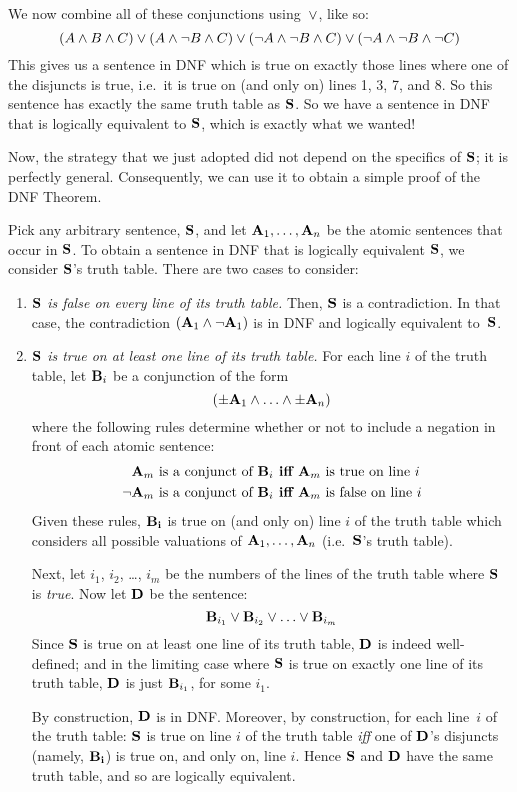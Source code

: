 We now combine all of these conjunctions using~$\vee$, like so:
$$(A \wedge B \wedge C) \vee (A \wedge \neg B \wedge C) \vee (\neg A \wedge \neg B \wedge C) \vee (\neg A \wedge \neg B \wedge \neg C)$$
This gives us a sentence in DNF which is true on exactly those lines where one of the disjuncts is true, i.e.\ it is true on (and only on) lines 1, 3, 7, and 8. So this sentence has exactly the same truth table as $\mathbf{S}$. So we have a sentence in DNF that is logically equivalent to $\mathbf{S}$, which is exactly what we wanted!

Now, the strategy that we just adopted did not depend on the specifics of $\mathbf{S}$; it is perfectly general. Consequently, we can use it to obtain a simple proof of the DNF Theorem.

Pick any arbitrary sentence, $\mathbf{S}$, and let $\mathbf{A}_1, \ldots, \mathbf{A}_n$ be the atomic sentences that occur in $\mathbf{S}$. To obtain a sentence in DNF that is logically equivalent $\mathbf{S}$, we consider $\mathbf{S}$'s truth table. There are two cases to consider:
	\begin{enumerate}
		\item \emph{$\mathbf{S}$ is false on every line of its truth table.} Then, $\mathbf{S}$ is a contradiction. In that case, the contradiction $(\mathbf{A}_1 \wedge \neg \mathbf{A}_1)$ is in DNF and logically equivalent to~$\mathbf{S}$. 
	
		\item \emph{$\mathbf{S}$ is true on at least one line of its truth table.}
		For each line $i$ of the truth table, let $\mathbf{B}_i$ be a conjunction of the form 
		$$(\pm\mathbf{A}_1 \land \ldots \land \pm\mathbf{A}_n)$$
		where the following rules determine whether or not to include a negation in front of each atomic sentence:
			\begin{align*}
				\mathbf{A}_m\text{ is a conjunct of }\mathbf{B}_i&\textbf{ iff }\mathbf{A}_m\text{ is true on line }i\\
				\neg\mathbf{A}_m\text{ is a conjunct of }\mathbf{B}_i&\textbf{ iff }\mathbf{A}_m\text{ is false on line }i
			\end{align*}
		Given these rules, $\mathbf{B_i}$ is true on (and only on) line $i$ of the truth table which considers all possible valuations of $\mathbf{A}_1, \ldots, \mathbf{A}_n$ (i.e.\ $\mathbf{S}$'s truth table). 
		
		Next, let $i_1$, $i_2$, \dots, $i_m$ be the numbers of the lines of the truth table where $\mathbf{S}$ is \emph{true}. Now let $\mathbf{D}$ be the sentence:
		$$\mathbf{B}_{i_1} \vee \mathbf{B}_{i_2} \vee \ldots \vee \mathbf{B}_{i_m}$$
		Since $\mathbf{S}$ is true on at least one line of its truth table, $\mathbf{D}$ is indeed well-defined; and in the limiting case where $\mathbf{S}$ is true on exactly one line of its truth table, $\mathbf{D}$ is just $\mathbf{B}_{i_1}$, for some $i_1$.
		
		By construction, $\mathbf{D}$ is in DNF. Moreover, by construction, for each line~$i$ of the truth table: $\mathbf{S}$ is true on line $i$ of the truth table \emph{iff} one of $\mathbf{D}$'s disjuncts (namely, $\mathbf{B_i}$) is true on, and only on, line $i$. Hence $\mathbf{S}$ and $\mathbf{D}$ have the same truth table, and so are logically equivalent.
	\end{enumerate}
